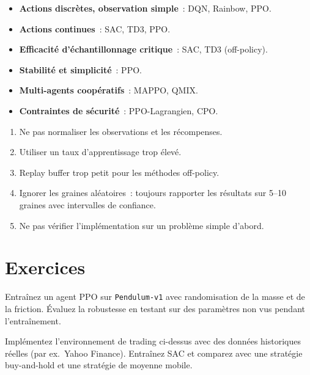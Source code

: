 \begin{formules}[title=\textbf{Guide de choix d'algorithme}]
\begin{itemize}
    \item \textbf{Actions discr\`etes, observation simple}~: DQN, Rainbow, PPO.
    \item \textbf{Actions continues}~: SAC, TD3, PPO.
    \item \textbf{Efficacit\'e d'\'echantillonnage critique}~: SAC, TD3 (off-policy).
    \item \textbf{Stabilit\'e et simplicit\'e}~: PPO.
    \item \textbf{Multi-agents coop\'eratifs}~: MAPPO, QMIX.
    \item \textbf{Contraintes de s\'ecurit\'e}~: PPO-Lagrangien, CPO.
\end{itemize}
\end{formules}

\begin{attention}[title=\textbf{Pi\`eges courants}]
\begin{enumerate}
    \item Ne pas normaliser les observations et les r\'ecompenses.
    \item Utiliser un taux d'apprentissage trop \'elev\'e.
    \item Replay buffer trop petit pour les m\'ethodes off-policy.
    \item Ignorer les graines al\'eatoires~: toujours rapporter les r\'esultats
    sur 5--10 graines avec intervalles de confiance.
    \item Ne pas v\'erifier l'impl\'ementation sur un probl\`eme simple d'abord.
\end{enumerate}
\end{attention}

\section{Exercices}

\begin{exercice}
Entra\^inez un agent PPO sur \texttt{Pendulum-v1} avec randomisation de la masse
et de la friction. \'Evaluez la robustesse en testant sur des param\`etres non
vus pendant l'entra\^inement.
\end{exercice}

\begin{exercice}[Trading]
Impl\'ementez l'environnement de trading ci-dessus avec des donn\'ees historiques
r\'eelles (par ex.\ Yahoo Finance). Entra\^inez SAC et comparez avec une
strat\'egie buy-and-hold et une strat\'egie de moyenne mobile.
\end{exercice}

